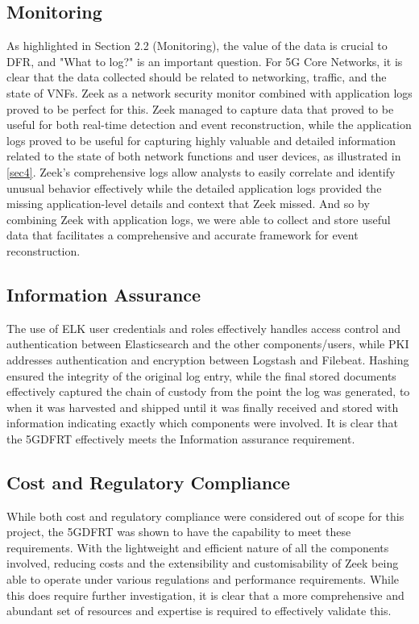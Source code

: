 \documentclass[final,1p,times,authoryear]{elsarticle}
\begin{document}
\subsection{Monitoring}
\label{sub5sec1}
As highlighted in Section 2.2 (Monitoring), the value of the data is crucial to DFR, and "What to log?" is an important question. For 5G Core Networks, it is clear that the data collected should be related to networking, traffic, and the state of VNFs. Zeek as a network security monitor combined with application logs proved to be perfect for this. Zeek managed to capture data that proved to be useful for both real-time detection and event reconstruction, while the application logs proved to be useful for capturing highly valuable and detailed information related to the state of both network functions and user devices, as illustrated in \ref{sec4}. Zeek's comprehensive logs allow analysts to easily correlate and identify unusual behavior effectively while the detailed application logs provided the missing application-level details and context that Zeek missed. And so by combining Zeek with application logs, we were able to collect and store useful data that facilitates a comprehensive and accurate framework for event reconstruction.

\subsection{Information Assurance}
\label{sub5sec2}
The use of ELK user credentials and roles effectively handles access control and authentication between Elasticsearch and the other components/users, while PKI addresses authentication and encryption between Logstash and Filebeat. Hashing ensured the integrity of the original log entry, while the final stored documents effectively captured the chain of custody from the point the log was generated, to when it was harvested and shipped until it was finally received and stored with information indicating exactly which components were involved. It is clear that the 5GDFRT effectively meets the Information assurance requirement.

\subsection{Cost and Regulatory Compliance}
\label{sub5sec3}
While both cost and regulatory compliance were considered out of scope for this project, the 5GDFRT was shown to have the capability to meet these requirements. With the lightweight and efficient nature of all the components involved, reducing costs and the extensibility and customisability of Zeek being able to operate under various regulations and performance requirements. While this does require further investigation, it is clear that a more comprehensive and abundant set of resources and expertise is required to effectively validate this.
\end{document}
